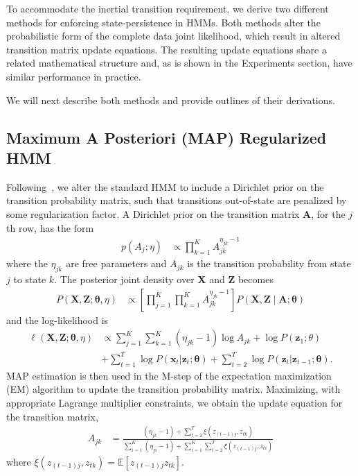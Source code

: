 \documentclass[letterpaper]{article}
\begin{document}
To accommodate the inertial transition requirement, we derive two different
methods for enforcing state-persistence in HMMs. Both methods alter the
probabilistic form of the complete data joint likelihood, which result
in altered transition matrix update equations. The resulting update equations
share a related mathematical structure and, as is shown in
the Experiments section, have similar performance in practice.

We will next describe both methods and provide outlines of their derivations. 

\subsection{Maximum A Posteriori (MAP) Regularized HMM}

Following~\cite{MAP1994}, we alter the standard HMM to include a Dirichlet prior on the transition probability matrix, such that transitions out-of-state are penalized by some regularization factor. A Dirichlet prior on the transition matrix $\mathbf{A}$, for the $j$th row, has the form
\begin{align*}
    p(A_j; \eta) &\propto \prod_{k=1}^{K} A_{jk}^{\eta_{jk}-1}
\end{align*}
where the $\eta_{jk}$ are free parameters and $A_{jk}$ is the transition probability from state $j$ to state $k$. The posterior joint density over $\mathbf{X}$ and $\mathbf{Z}$ becomes
\begin{align*}
    P(\mathbf{X}, \mathbf{Z} ; \mathbf{\theta}, \eta) 
    &\propto \left[\prod_{j=1}^{K}\prod_{k=1}^{K} A_{jk}^{\eta_{jk} - 1}\right] P(\mathbf{X}, \mathbf{Z} \mid \mathbf{A}; \mathbf{\theta}) 
\end{align*}
and the log-likelihood is
\begin{align*}
\ell(\mathbf{X}, \mathbf{Z} ; \mathbf{\theta}, \eta) 
&\propto \sum_{j=1}^{K}\sum_{k=1}^{K} (\eta_{jk} - 1)\log A_{jk} + \log P(\mathbf{z}_{1}; \theta) \\
&+ \sum_{t=1}^{T}\log P(\mathbf{x}_t|\mathbf{z}_t; \mathbf{\theta}) + \sum_{t=2}^{T}\log P(\mathbf{z}_t|\mathbf{z}_{t-1}; \mathbf{\theta}).
\end{align*}
MAP estimation is then used in the M-step of the expectation maximization (EM) algorithm to update the transition probability matrix. Maximizing, with appropriate Lagrange multiplier constraints, we obtain the update equation for the transition matrix, 
\begin{align}
    A_{jk} &= \frac{(\eta_{jk} - 1) + \sum_{t=2}^{T} \xi(z_{(t-1)j}, z_{tk})}   
    {\sum_{i=1}^{K}(\eta_{ji} - 1) + \sum_{i=1}^{K}\sum_{t=2}^{T} \xi(z_{(t-1)j}, z_{ti})}
\end{align}
where $\xi(z_{(t-1)j}, z_{tk})=\mathbb{E}[z_{(t-1)j}z_{tk}]$.
\end{document}
